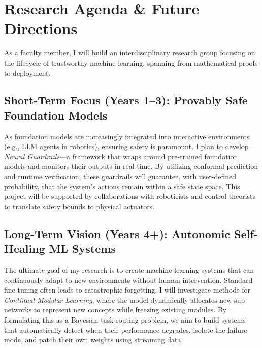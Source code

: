 \section{Research Agenda \& Future Directions}
As a faculty member, I will build an interdisciplinary research group focusing on the lifecycle of trustworthy machine learning, spanning from mathematical proofs to deployment.

\subsection{Short-Term Focus (Years 1--3): Provably Safe Foundation Models}
As foundation models are increasingly integrated into interactive environments (e.g., LLM agents in robotics), ensuring safety is paramount. I plan to develop \emph{Neural Guardrails}---a framework that wraps around pre-trained foundation models and monitors their outputs in real-time. By utilizing conformal prediction and runtime verification, these guardrails will guarantee, with user-defined probability, that the system's actions remain within a safe state space. This project will be supported by collaborations with roboticists and control theorists to translate safety bounds to physical actuators.

\subsection{Long-Term Vision (Years 4+): Autonomic Self-Healing ML Systems}
The ultimate goal of my research is to create machine learning systems that can continuously adapt to new environments without human intervention. Standard fine-tuning often leads to catastrophic forgetting. I will investigate methods for \emph{Continual Modular Learning}, where the model dynamically allocates new sub-networks to represent new concepts while freezing existing modules. By formulating this as a Bayesian task-routing problem, we aim to build systems that automatically detect when their performance degrades, isolate the failure mode, and patch their own weights using streaming data.

